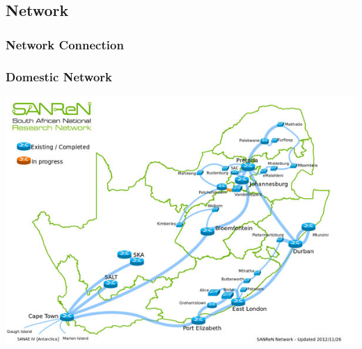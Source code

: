 \documentclass{beamer}
\begin{document}
\subsection{Network}

\begin{frame}
  \frametitle{Network Connection}
\end{frame}

\begin{frame}
    \frametitle{Domestic Network}
    \includegraphics[scale=0.5]{Sanren-network.jpg}
\end{frame}
\end{document}
